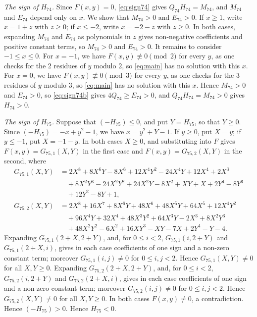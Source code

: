 \documentclass[11pt]{article}
\begin{document}
\emph{The sign of $H_{74}$.} Since $F(x,y)=0$, \eqref{eq:sign74} gives $Q_{74}H_{74}=M_{74}$, and $M_{74}$ and $E_{74}$ depend only on $x$. We show that $M_{74}>0$ and $E_{74}>0$. If $x\geq1$, write $x=1+z$ with $z\geq0$; if $x\leq-2$, write $x=-2-z$ with $z\geq0$. In both cases, expanding $M_{74}$ and $E_{74}$ as polynomials in $z$ gives non-negative coefficients and positive constant terms, so $M_{74}>0$ and $E_{74}>0$. It remains to consider $-1\leq x\leq0$. For $x=-1$, we have $F(x,y)\not\equiv0\pmod{2}$ for every $y$, as one checks for the 2 residues of $y$ modulo $2$, so \eqref{eq:main} has no solution with this $x$. For $x=0$, we have $F(x,y)\not\equiv0\pmod{3}$ for every $y$, as one checks for the 3 residues of $y$ modulo $3$, so \eqref{eq:main} has no solution with this $x$. Hence $M_{74}>0$ and $E_{74}>0$, so \eqref{eq:sign74b} gives $4Q_{74}\geq E_{74}>0$, and $Q_{74}H_{74}=M_{74}>0$ gives $H_{74}>0$.

\emph{The sign of $H_{75}$.} Suppose that $(-H_{75})\leq0$, and put $Y=H_{75}$, so that $Y\geq0$. Since $(-H_{75})=-x+y^{2}-1$, we have $x=y^{2}+Y-1$. If $y\geq0$, put $X=y$; if $y\leq-1$, put $X=-1-y$. In both cases $X\geq0$, and substituting into $F$ gives $F(x,y)=G_{75,1}(X,Y)$ in the first case and $F(x,y)=G_{75,2}(X,Y)$ in the second, where
\begin{align*}
G_{75,1}(X,Y)&=2X^{8}+8X^{6}Y-8X^{6}+12X^{4}Y^{2}-24X^{4}Y+12X^{4}+2X^{3}\\
&\quad+8X^{2}Y^{3}-24X^{2}Y^{2}+24X^{2}Y-8X^{2}+XY+X+2Y^{4}-8Y^{3}\\
&\quad+12Y^{2}-8Y+1,\\
G_{75,2}(X,Y)&=2X^{8}+16X^{7}+8X^{6}Y+48X^{6}+48X^{5}Y+64X^{5}+12X^{4}Y^{2}\\
&\quad+96X^{4}Y+32X^{4}+48X^{3}Y^{2}+64X^{3}Y-2X^{3}+8X^{2}Y^{3}\\
&\quad+48X^{2}Y^{2}-6X^{2}+16XY^{3}-XY-7X+2Y^{4}-Y-4.
\end{align*}
Expanding $G_{75,1}(2+X,2+Y)$, and, for $0\leq i<2$, $G_{75,1}(i,2+Y)$ and $G_{75,1}(2+X,i)$, gives in each case coefficients of one sign and a non-zero constant term; moreover $G_{75,1}(i,j)\neq0$ for $0\leq i,j<2$. Hence $G_{75,1}(X,Y)\neq0$ for all $X,Y\geq0$. Expanding $G_{75,2}(2+X,2+Y)$, and, for $0\leq i<2$, $G_{75,2}(i,2+Y)$ and $G_{75,2}(2+X,i)$, gives in each case coefficients of one sign and a non-zero constant term; moreover $G_{75,2}(i,j)\neq0$ for $0\leq i,j<2$. Hence $G_{75,2}(X,Y)\neq0$ for all $X,Y\geq0$. In both cases $F(x,y)\neq0$, a contradiction. Hence $(-H_{75})>0$. Hence $H_{75}<0$.
\end{document}
